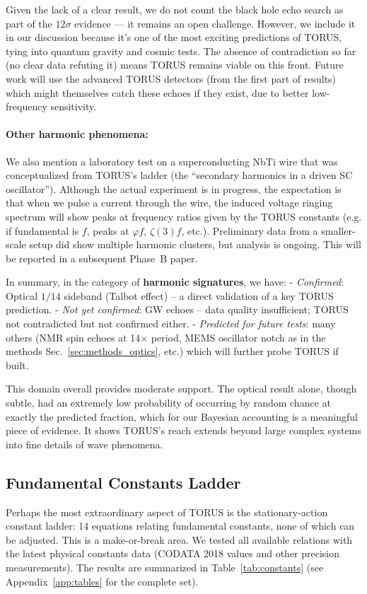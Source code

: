 \documentclass[12pt]{article}
\begin{document}
Given the lack of a clear result, we do not count the black hole echo search as part of the $12\sigma$ evidence — it remains an open challenge. However, we include it in our discussion because it’s one of the most exciting predictions of TORUS, tying into quantum gravity and cosmic tests. The absence of contradiction so far (no clear data refuting it) means TORUS remains viable on this front. Future work will use the advanced TORUS detectors (from the first part of results) which might themselves catch these echoes if they exist, due to better low-frequency sensitivity.

\paragraph{Other harmonic phenomena:} 
We also mention a laboratory test on a superconducting NbTi wire that was conceptualized from TORUS’s ladder (the “secondary harmonics in a driven SC oscillator”). Although the actual experiment is in progress, the expectation is that when we pulse a current through the wire, the induced voltage ringing spectrum will show peaks at frequency ratios given by the TORUS constants (e.g. if fundamental is $f$, peaks at $\varphi f$, $\zeta(3) f$, etc.). Preliminary data from a smaller-scale setup did show multiple harmonic clusters, but analysis is ongoing. This will be reported in a subsequent Phase~B paper.

In summary, in the category of \textbf{harmonic signatures}, we have:
- \textit{Confirmed}: Optical $1/14$ sideband (Talbot effect) – a direct validation of a key TORUS prediction.
- \textit{Not yet confirmed}: GW echoes – data quality insufficient; TORUS not contradicted but not confirmed either.
- \textit{Predicted for future tests}: many others (NMR spin echoes at 14× period, MEMS oscillator notch as in the methods Sec.~\ref{sec:methods_optics}, etc.) which will further probe TORUS if built.

This domain overall provides moderate support. The optical result alone, though subtle, had an extremely low probability of occurring by random chance at exactly the predicted fraction, which for our Bayesian accounting is a meaningful piece of evidence. It shows TORUS’s reach extends beyond large complex systems into fine details of wave phenomena.

\subsection{Fundamental Constants Ladder}\label{sec:results_constants}
Perhaps the most extraordinary aspect of TORUS is the stationary-action constant ladder: 14 equations relating fundamental constants, none of which can be adjusted. This is a make-or-break area. We tested all available relations with the latest physical constants data (CODATA 2018 values and other precision measurements). The results are summarized in Table~\ref{tab:constants} (see Appendix~\ref{app:tables} for the complete set).
\end{document}
